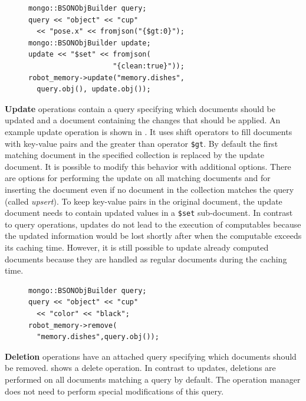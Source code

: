 \begin{figure}
  \vspace{-0.4cm}
\begin{lstlisting}[style=SmallCpp,
  caption={Update operation to mark one cup in an area as clean},
  label=lst:impl-update,
  framexleftmargin=5pt, xleftmargin=0pt,
 morekeywords={}, numbers=none]
mongo::BSONObjBuilder query;
query << "object" << "cup"
  << "pose.x" << fromjson("{$gt:0}");
mongo::BSONObjBuilder update;
update << "$set" << fromjson(
                    "{clean:true}"));
robot_memory->update("memory.dishes",
  query.obj(), update.obj());
\end{lstlisting}%
\vspace{-10mm}
\end{figure}
\textbf{Update} operations contain a query specifying which documents
should be updated and a document containing the changes that should be
applied. An example update operation is shown in
. It uses shift operators to fill documents
with key-value pairs and the greater than operator \texttt{\$gt}.
By default the first matching document in the specified
collection is replaced by the update document. It is possible to
modify this behavior with additional options. There are options for
performing the update on all matching documents and for inserting the
document even if no document in the collection matches the query
(called \emph{upsert}). To keep key-value pairs in the original
document, the update document needs to contain updated values in a
\texttt{\$set} sub-document. In contrast to
query operations, updates do not lead to the execution of computables
because the updated information would be lost shortly after when the computable
exceeds its caching time. However, it is still possible to update
already computed documents because they are handled as regular
documents during the caching time.

\begin{figure}
  \vspace{-0.4cm}
\begin{lstlisting}[style=SmallCpp,
  caption={Deletion of all black cups},
  label=lst:impl-delete,
  framexleftmargin=5pt, xleftmargin=0pt,
 morekeywords={}, numbers=none]
mongo::BSONObjBuilder query;
query << "object" << "cup"
  << "color" << "black";
robot_memory->remove(
  "memory.dishes",query.obj());
\end{lstlisting}
\vspace{-8mm}
\end{figure}
\textbf{Deletion} operations have an attached query specifying which
documents should be removed.  shows a delete
operation. In contrast to updates, deletions are performed on all
documents matching a query by default.  The operation manager does not
need to perform special modifications of this query.

